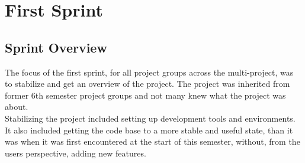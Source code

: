 \chapter{First Sprint}
\label{cha:sprint_1}

\section{Sprint Overview}


The focus of the first sprint, for all project groups across the multi-project, was to stabilize and get an overview of the project. The project was inherited from former 6th semester project groups and not many knew what the \giraf project was about.
\\
Stabilizing the project included setting up development tools and environments. It also included getting the code base to a more stable and useful state, than it was when it was first encountered at the start of this semester, without, from the users perspective, adding new features.  
